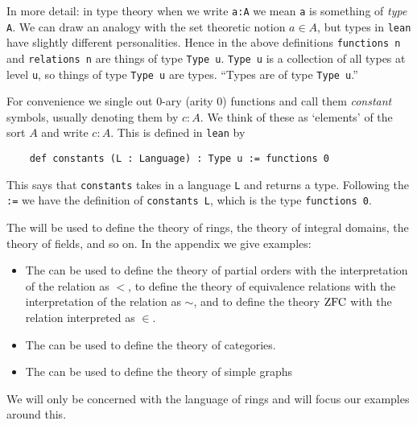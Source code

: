 \begin{dfn}[Language]
  In more detail: in type theory when we write \texttt{a:A} we mean \texttt{a} is something
  of \textit{type} \texttt{A}.
  We can draw an analogy with the set theoretic notion $a \in A$,
  but types in \texttt{lean} have slightly different personalities.
  Hence in the above definitions \texttt{functions n} and \texttt{relations n}
  are things of type \texttt{Type u}.
  \texttt{Type u} is a collection of all types at level \texttt{u},
  so things of type \texttt{Type u} are types.
  ``Types are of type \texttt{Type u}.''

  For convenience we single out $0$-ary (arity $0$) functions and
  call them \textit{constant} symbols, usually denoting them by $c : A$.
  We think of these as `elements' of the sort $A$ and write $c : A$.
  This is defined in \texttt{lean} by

  \begin{lstlisting}
    def constants (L : Language) : Type u := functions 0\end{lstlisting}

  This says that \texttt{constants} takes in a language \texttt{L} and returns a type.
  Following the \texttt{:=} we have the definition of \texttt{constants L},
  which is the type \texttt{functions 0}.
\end{dfn}

\begin{eg}
  The 
  will be used to define the theory of rings,
  the theory of integral domains, the theory of fields, and so on.
  In the appendix we give examples:
  \begin{itemize}
    \item The  %
          can be used to define the theory of partial orders
          with the interpretation of the relation as $<$,
          to define the theory of equivalence relations with the
          interpretation of the relation as $\sim$,
          and to define the theory $\operatorname{ZFC}$ with the relation interpreted as $\in$.
    \item The  %
          can be used to define the theory of categories.
    \item The 
          can be used to define the theory of simple graphs
  \end{itemize}
  We will only be concerned with the language of rings and will
  focus our examples around this.
\end{eg}

